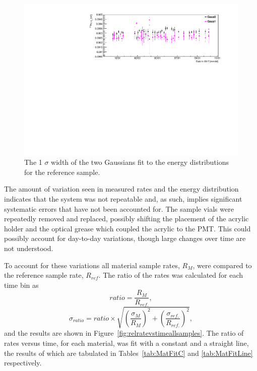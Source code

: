 \begin{figure}[h]
	\centering
	\includegraphics[width=0.9\linewidth]{tex/6-ac227-images/BNL/PoEnWidthVsTime_S2}
	\caption{The 1 $\sigma$ width of the two Gaussians fit to the \Po energy distributions for the reference sample.}
	\label{fig:poenwidthvstimes2}
\end{figure}

The amount of variation seen in measured rates and the \Po energy distribution indicates that the system was not repeatable and, as such, implies significant systematic errors that have not been accounted for. 
The sample vials were repeatedly removed and replaced, possibly shifting the placement of the acrylic holder and the optical grease which coupled the acrylic to the PMT. 
This could possibly account for day-to-day variations, though large changes over time are not understood. 

To account for these variations all material sample rates, $R_M$, were compared to the reference sample rate, $R_{ref}$.
The ratio of the rates was calculated for each time bin as
\begin{equation}
ratio = \frac{R_M}{R_{ref.}},
\end{equation}
\begin{equation}
\sigma_{ratio} = ratio \times \sqrt{\left(\frac{\sigma_{M}}{R_{M}}\right)^2+\left(\frac{\sigma_{ref.}}{R_{ref.}}\right)^2},
\end{equation}
and the results are shown in Figure~\ref{fig:relratevstimeallsamples}.
The ratio of rates versus time, for each material, was fit with a constant and a straight line, the results of which are tabulated in Tables~\ref{tab:MatFitC} and \ref{tab:MatFitLine} respectively.

